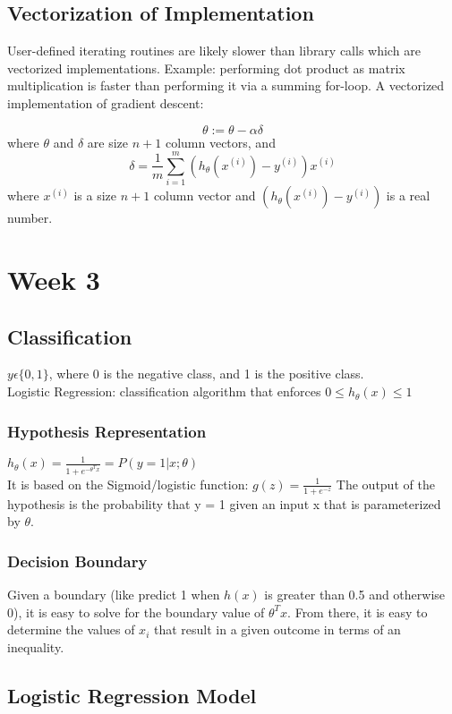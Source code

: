 \documentclass[11pt,letterpaper]{article}
\begin{document}
\subsection{Vectorization of Implementation}
User-defined iterating routines are likely slower than library calls which are vectorized implementations. Example: performing dot product as matrix multiplication is faster than performing it via a summing for-loop. A vectorized implementation of gradient descent:

$$ \theta := \theta - \alpha \delta $$ where $\theta$ and $\delta$ are size $n+1$ column vectors, and 
$$ \delta = \frac{1}{m}\sum_{i=1}^{m}(h_\theta(x^{(i)}) - y^{(i)})x^{(i)} $$ where $x^{(i)}$ is a size $n+1$ column vector and $(h_\theta(x^{(i)}) - y^{(i)})$ is a real number.

\section{Week 3}
\subsection{Classification}
$ y \epsilon \{0, 1\}$, where 0 is the negative class, and 1 is the positive class.\\
Logistic Regression: classification algorithm that enforces $ 0 \leq h_\theta(x) \leq 1$
\subsubsection{Hypothesis Representation}
$h_\theta(x) = \frac{1}{1 + e^{-\theta^Tx}} = P(y = 1| x; \theta)$\\
It is based on the Sigmoid/logistic function: $g(z) = \frac{1}{1 + e^{-z}} $
The output of the hypothesis is the probability that y = 1 given an input x that is parameterized by $\theta$.\\

\subsubsection{Decision Boundary}
Given a boundary (like predict 1 when $h(x)$ is greater than 0.5 and otherwise 0), it is easy to solve for the boundary value of $\theta^Tx$. From there, it is easy to determine the values of $x_i$ that result in a given outcome in terms of an inequality.

\subsection{Logistic Regression Model}
\end{document}
